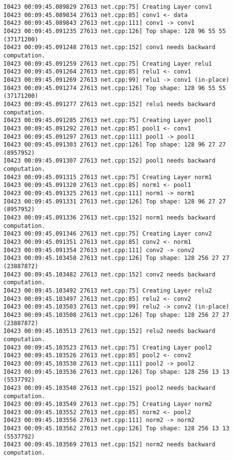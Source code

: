 \documentclass[a4]{article}
\begin{document}
\begin{lstlisting}
I0423 00:09:45.089829 27613 net.cpp:75] Creating Layer conv1
I0423 00:09:45.089834 27613 net.cpp:85] conv1 <- data
I0423 00:09:45.089843 27613 net.cpp:111] conv1 -> conv1
I0423 00:09:45.091235 27613 net.cpp:126] Top shape: 128 96 55 55 (37171200)
I0423 00:09:45.091248 27613 net.cpp:152] conv1 needs backward computation.
I0423 00:09:45.091259 27613 net.cpp:75] Creating Layer relu1
I0423 00:09:45.091264 27613 net.cpp:85] relu1 <- conv1
I0423 00:09:45.091269 27613 net.cpp:99] relu1 -> conv1 (in-place)
I0423 00:09:45.091274 27613 net.cpp:126] Top shape: 128 96 55 55 (37171200)
I0423 00:09:45.091277 27613 net.cpp:152] relu1 needs backward computation.
I0423 00:09:45.091285 27613 net.cpp:75] Creating Layer pool1
I0423 00:09:45.091292 27613 net.cpp:85] pool1 <- conv1
I0423 00:09:45.091297 27613 net.cpp:111] pool1 -> pool1
I0423 00:09:45.091303 27613 net.cpp:126] Top shape: 128 96 27 27 (8957952)
I0423 00:09:45.091307 27613 net.cpp:152] pool1 needs backward computation.
I0423 00:09:45.091315 27613 net.cpp:75] Creating Layer norm1
I0423 00:09:45.091320 27613 net.cpp:85] norm1 <- pool1
I0423 00:09:45.091325 27613 net.cpp:111] norm1 -> norm1
I0423 00:09:45.091331 27613 net.cpp:126] Top shape: 128 96 27 27 (8957952)
I0423 00:09:45.091336 27613 net.cpp:152] norm1 needs backward computation.
I0423 00:09:45.091346 27613 net.cpp:75] Creating Layer conv2
I0423 00:09:45.091351 27613 net.cpp:85] conv2 <- norm1
I0423 00:09:45.091354 27613 net.cpp:111] conv2 -> conv2
I0423 00:09:45.103458 27613 net.cpp:126] Top shape: 128 256 27 27 (23887872)
I0423 00:09:45.103482 27613 net.cpp:152] conv2 needs backward computation.
I0423 00:09:45.103492 27613 net.cpp:75] Creating Layer relu2
I0423 00:09:45.103497 27613 net.cpp:85] relu2 <- conv2
I0423 00:09:45.103503 27613 net.cpp:99] relu2 -> conv2 (in-place)
I0423 00:09:45.103508 27613 net.cpp:126] Top shape: 128 256 27 27 (23887872)
I0423 00:09:45.103513 27613 net.cpp:152] relu2 needs backward computation.
I0423 00:09:45.103523 27613 net.cpp:75] Creating Layer pool2
I0423 00:09:45.103526 27613 net.cpp:85] pool2 <- conv2
I0423 00:09:45.103530 27613 net.cpp:111] pool2 -> pool2
I0423 00:09:45.103536 27613 net.cpp:126] Top shape: 128 256 13 13 (5537792)
I0423 00:09:45.103540 27613 net.cpp:152] pool2 needs backward computation.
I0423 00:09:45.103549 27613 net.cpp:75] Creating Layer norm2
I0423 00:09:45.103552 27613 net.cpp:85] norm2 <- pool2
I0423 00:09:45.103556 27613 net.cpp:111] norm2 -> norm2
I0423 00:09:45.103562 27613 net.cpp:126] Top shape: 128 256 13 13 (5537792)
I0423 00:09:45.103569 27613 net.cpp:152] norm2 needs backward computation.

\end{lstlisting}
\end{document}
